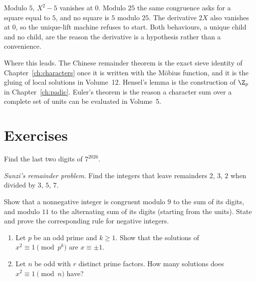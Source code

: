 \begin{examplex}
Modulo $5$, $X^2-5$ vanishes at $0$. Modulo $25$ the same congruence asks for a square equal to $5$, and no square is $5$ modulo $25$. The derivative $2X$ also vanishes at $0$, so the unique-lift machine refuses to start. Both behaviours, a unique child and no child, are the reason the derivative is a hypothesis rather than a convenience.
\end{examplex}

\begin{beauty}
Where this leads. The Chinese remainder theorem is the exact sieve identity of Chapter~\ref{ch:characters} once it is written with the M\"obius function, and it is the gluing of local solutions in Volume~12. Hensel's lemma is the construction of $\Z_p$ in Chapter~\ref{ch:padic}. Euler's theorem is the reason a character sum over a complete set of units can be evaluated in Volume~5.
\end{beauty}

\section{Exercises}

\begin{exercise}[$\star$]\label{ex:last2}
Find the last two digits of $7^{2026}$.
\end{exercise}

\begin{exercise}[$\star$]\label{ex:sunzi}
\emph{Sunzi's remainder problem.} Find the integers that leave remainders $2$, $3$, $2$ when divided by $3$, $5$, $7$.
\end{exercise}

\begin{exercise}[$\star$]\label{ex:digits}
Show that a nonnegative integer is congruent modulo $9$ to the sum of its digits, and modulo $11$ to the alternating sum of its digits (starting from the units). State and prove the corresponding rule for negative integers.
\end{exercise}

\begin{exercise}[$\star\star$]\label{ex:sqrt1}
\begin{enumerate}[label=(\alph*)]
\item Let $p$ be an odd prime and $k\ge1$. Show that the solutions of $x^2\equiv1\pmod{p^k}$ are $x\equiv\pm1$.
\item Let $n$ be odd with $r$ distinct prime factors. How many solutions does $x^2\equiv1\pmod n$ have?
\end{enumerate}
\end{exercise}

